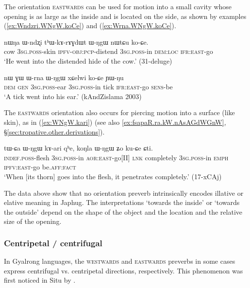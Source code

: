 The orientation \textsc{eastwards} can be used for motion into a small cavity whose opening is as large as the inside and is located on the side, as shown by examples (\ref{ex:Wndzri.WNgW.koCe}) and (\ref{ex:Wrna.WNgW.koCe}).

\begin{exe}
\ex \label{ex:Wndzri.WNgW.koCe}
\gll nɯŋa ɯ-ndʐi tʰɯ-kɤ-rɤɣdɯt ɯ-ŋgɯ nɯtɕu ko-ɕe. \\
cow \textsc{3sg}.\textsc{poss}-skin \textsc{ipfv}-\textsc{obj}:\textsc{pcp}-distend \textsc{3sg}.\textsc{poss}-in \textsc{dem}:\textsc{loc} \textsc{ifr}:\textsc{east}-go \\
\glt `He went into the distended hide of the cow.' (31-deluge)
\end{exe}

\begin{exe}
\ex \label{ex:Wrna.WNgW.koCe}
\gll nɯ ɣɯ ɯ-rna ɯ-ŋgɯ xɕelwi ko-ɕe ɲɯ-ŋu \\
\textsc{dem} \textsc{gen} \textsc{3sg}.\textsc{poss}-ear \textsc{3sg}.\textsc{poss}-in tick \textsc{ifr}:\textsc{east}-go \textsc{sens}-be \\
\glt `A tick went into his ear.' (kAndZislama 2003)
\end{exe}

The \textsc{eastwards} orientation also occurs for piercing motion into a surface (like skin), as in (\ref{ex:WNgW.kari}) (see also \ref{ex:fsapaR.ra.kW.nAsAGdWGnW}, §\ref{sec:tropative.other.derivations}).

\begin{exe}
\ex \label{ex:WNgW.kari}
\gll  tɯ-ɕa ɯ-ŋgɯ kɤ-ari qʰe, koŋla ɯ-ŋgɯ ʑo ku-ɕe ɕti. \\
\textsc{indef}.\textsc{poss}-flesh \textsc{3sg}.\textsc{poss}-in \textsc{aor}:\textsc{east}-go[II] \textsc{lnk} completely \textsc{3sg}.\textsc{poss}-in \textsc{emph} \textsc{ipfv}:\textsc{east}-go be.\textsc{aff}:\textsc{fact} \\
\glt `When [its thorn] goes into the flesh, it penetrates completely.' (17-xCAj)
 \end{exe} 

The data above show that no orientation preverb intrinsically encodes illative or elative meaning in Japhug. The interpretations `towards the inside' or `towards the outside' depend on the shape of the object and the location and the relative size of the opening.
 
\subsubsection{Centripetal / centrifugal} \label{sec:centripetal.centrifugal}
In Gyalrong languages, the \textsc{westwards} and \textsc{eastwards} preverbs in some cases express centrifugal vs. centripetal directions, respectively. This phenomenon was first noticed in Situ by \citet[228--229]{linxr93jiarong}.
 
